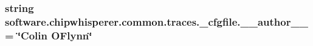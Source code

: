 \subsubsection[{\+\_\+\+\_\+author\+\_\+\+\_\+}]{\setlength{\rightskip}{0pt plus 5cm}string software.\+chipwhisperer.\+common.\+traces.\+\_\+cfgfile.\+\_\+\+\_\+author\+\_\+\+\_\+ = \char`\"{}Colin O\textquotesingle{}Flynn\char`\"{}}\label{namespacesoftware_1_1chipwhisperer_1_1common_1_1traces_1_1__cfgfile_ace8a3b8ccc370e5d6fc081e07eb5ea19}
